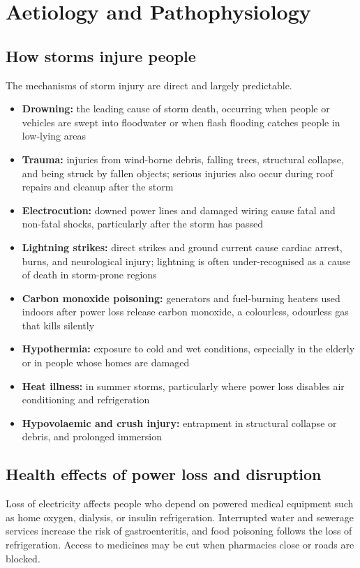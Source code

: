 \section*{Aetiology and Pathophysiology}
\subsection*{How storms injure people}
The mechanisms of storm injury are direct and largely predictable.

\begin{itemize}
    \item \textbf{Drowning:} the leading cause of storm death, occurring when people or vehicles are swept into floodwater or when flash flooding catches people in low-lying areas
    \item \textbf{Trauma:} injuries from wind-borne debris, falling trees, structural collapse, and being struck by fallen objects; serious injuries also occur during roof repairs and cleanup after the storm
    \item \textbf{Electrocution:} downed power lines and damaged wiring cause fatal and non-fatal shocks, particularly after the storm has passed
    \item \textbf{Lightning strikes:} direct strikes and ground current cause cardiac arrest, burns, and neurological injury; lightning is often under-recognised as a cause of death in storm-prone regions
    \item \textbf{Carbon monoxide poisoning:} generators and fuel-burning heaters used indoors after power loss release carbon monoxide, a colourless, odourless gas that kills silently
    \item \textbf{Hypothermia:} exposure to cold and wet conditions, especially in the elderly or in people whose homes are damaged
    \item \textbf{Heat illness:} in summer storms, particularly where power loss disables air conditioning and refrigeration
    \item \textbf{Hypovolaemic and crush injury:} entrapment in structural collapse or debris, and prolonged immersion
\end{itemize}

\subsection*{Health effects of power loss and disruption}
Loss of electricity affects people who depend on powered medical equipment such as home oxygen, dialysis, or insulin refrigeration. Interrupted water and sewerage services increase the risk of gastroenteritis, and food poisoning follows the loss of refrigeration. Access to medicines may be cut when pharmacies close or roads are blocked.

